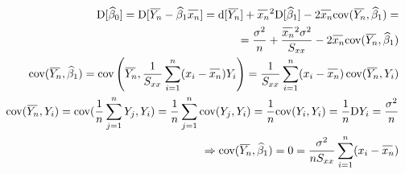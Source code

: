 \documentclass[oneside,intlimits,reqno]{scrbook}
\renewcommand{\d}{\mathrm{d}} %
\newcommand{\D}{\mathrm{D}} %
\newcommand{\overbar}[1]{\mkern 1mu\overline{\mkern-1mu#1\mkern-3mu}\mkern 3mu}
\newcommand{\oyn}{\overbar{\rule{0ex}{1.33ex}Y_n}}
\newcommand{\oxnn}{\overbar{\rule{0ex}{1.33ex}x_n}}
\newcommand{\sumjn}{\sum\limits_{j=1}^{n}}
\newcommand{\sumin}{\sum\limits_{i=1}^{n}}
\theoremstyle{definition}
\theoremstyle{plain}
\theoremstyle{remark}
\begin{document}
\begin{proofname}
\begin{enumerate}
\begin{equation*}
  \begin{aligned}
  			\D [ \widehat{\beta}_{0} ] = \D [ \oyn - \widehat{\beta}_{1} \oxnn ] = \d [ \oyn ] + \oxnn ^{2} \D [ \widehat{\beta}_{1} ] - 2 \oxnn \text{cov}(\oyn , \widehat{\beta}_{1} ) = \\
  	= \frac{\sigma^{2}}{n} + \frac{\oxnn ^{2} \sigma^{2} }{S_{xx}} - 2 \oxnn \text{cov}( \oyn ,  \widehat{\beta}_{1} ) \\
\text{cov}( \oyn ,  \widehat{\beta}_{1} ) = \text{cov} \left( \oyn , \frac{1}{S_{xx}} \sumin ( x_i - \oxnn ) Y_i \right) = \frac{1}{S_{xx}} \sumin ( x_i - \oxnn ) \, \text{cov} ( \oyn , Y_i )  \\
\text{cov} ( \oyn , Y_i ) = \text{cov} ( \frac{1}{n} \sumjn Y_j , Y_i ) =  \frac{1}{n} \sumjn \text{cov} ( Y_j , Y_i ) = \frac{1}{n} \text{cov} ( Y_i , Y_i ) =  	\frac{1}{n} \D Y_i =  \frac{\sigma^{2}}{n}	\\
\Rightarrow  \text{cov}( \oyn ,  \widehat{\beta}_{1} ) = 0 = \frac{\sigma^{2}}{n S_{xx}} \sumin ( x_i - \oxnn )	
  			\end{aligned}
  		\end{equation*}
\end{enumerate}
\end{proofname}
\end{document}
